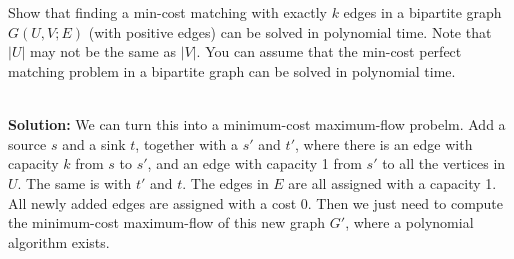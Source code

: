 

\section{}

Show that finding a min-cost matching with exactly $k$ edges in a bipartite graph $G(U,V;E)$ (with positive edges) can be solved in polynomial time. Note that $|U|$ may not be the same as $|V|$. You can assume that the min-cost perfect matching problem in a bipartite graph can be solved in polynomial time.

\ \\{\bf Solution:} We can turn this into a minimum-cost maximum-flow probelm. Add a source $s$ and a sink $t$, together with a $s'$ and $t'$, where there is an edge with capacity $k$ from $s$ to $s'$, and an edge with capacity 1 from $s'$ to all the vertices in $U$. The same is with $t'$ and $t$. The edges in $E$ are all assigned with a capacity 1. All newly added edges are assigned with a cost 0. Then we just need to compute the minimum-cost maximum-flow of this new graph $G'$, where a polynomial algorithm exists.